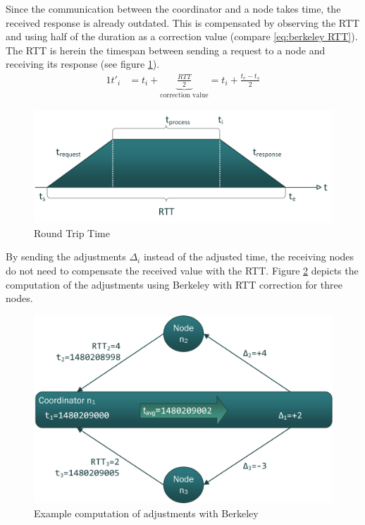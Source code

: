 		Since the communication between the coordinator and a node takes time, the received response is already outdated. This is compensated by observing the \gls{RTT} and using half of the duration as a correction value (compare \ref{eq:berkeley RTT}). The \gls{RTT} is herein the timespan between sending a request to a node and receiving its response (see figure \ref{figure:berkeley RTT}).
		\begin{alignat}{1}
		t'_i &=t_i+\underbrace{\frac{RTT}{2}}_{\text{correction value}}=t_i+\frac{t_e-t_s}{2} \label{eq:berkeley RTT}
		\end{alignat}
		
		\begin{figure}[!htbp] %
			\caption{Round Trip Time} \label{figure:berkeley RTT}
			\includegraphics[scale=1.0]{figures/berkeley-ion.png}
		\end{figure}
		
		 By sending the adjustments $\Delta_i$ instead of the adjusted time, the receiving nodes do not need to compensate the received value with the \gls{RTT}. Figure \ref{figure:berkeley example} depicts the computation of the adjustments using Berkeley with \gls{RTT} correction for three nodes. 
		
		\begin{figure}[!htbp] %
			\caption{Example computation of adjustments with Berkeley} \label{figure:berkeley example}
			\includegraphics[scale=1.0]{figures/berkeley-example-ion.png}
		\end{figure}
	
